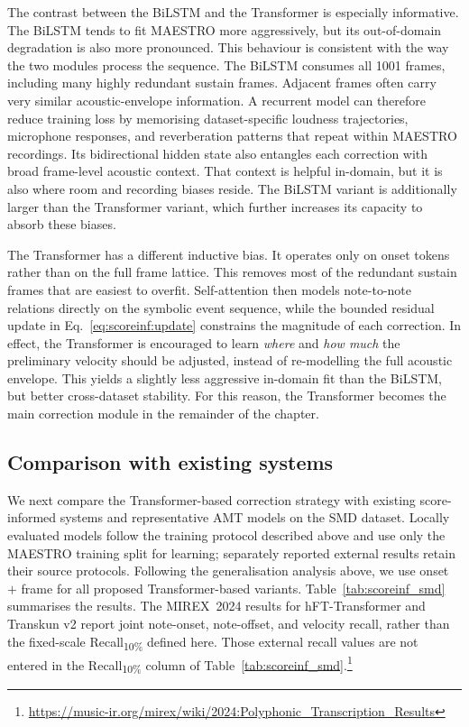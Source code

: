 The contrast between the BiLSTM and the Transformer is especially informative. The BiLSTM tends to fit MAESTRO more aggressively, but its out-of-domain degradation is also more pronounced. This behaviour is consistent with the way the two modules process the sequence. The BiLSTM consumes all 1001 frames, including many highly redundant sustain frames. Adjacent frames often carry very similar acoustic-envelope information. A recurrent model can therefore reduce training loss by memorising dataset-specific loudness trajectories, microphone responses, and reverberation patterns that repeat within MAESTRO recordings. Its bidirectional hidden state also entangles each correction with broad frame-level acoustic context. That context is helpful in-domain, but it is also where room and recording biases reside. The BiLSTM variant is additionally larger than the Transformer variant, which further increases its capacity to absorb these biases.

The Transformer has a different inductive bias. It operates only on onset tokens rather than on the full frame lattice. This removes most of the redundant sustain frames that are easiest to overfit. Self-attention then models note-to-note relations directly on the symbolic event sequence, while the bounded residual update in Eq.~\eqref{eq:scoreinf:update} constrains the magnitude of each correction. In effect, the Transformer is encouraged to learn \emph{where} and \emph{how much} the preliminary velocity should be adjusted, instead of re-modelling the full acoustic envelope. This yields a slightly less aggressive in-domain fit than the BiLSTM, but better cross-dataset stability. For this reason, the Transformer becomes the main correction module in the remainder of the chapter.

\subsection{Comparison with existing systems}
\label{sec:scoreinf:results:comparison}

We next compare the Transformer-based correction strategy with existing score-informed systems and representative AMT models on the SMD dataset. Locally evaluated models follow the training protocol described above and use only the MAESTRO training split for learning; separately reported external results retain their source protocols. Following the generalisation analysis above, we use onset $+$ frame for all proposed Transformer-based variants. Table~\ref{tab:scoreinf_smd} summarises the results. The MIREX~2024 results for hFT-Transformer and Transkun v2 report joint note-onset, note-offset, and velocity recall, rather than the fixed-scale Recall\textsubscript{10\%} defined here. Those external recall values are not entered in the Recall\textsubscript{10\%} column of Table~\ref{tab:scoreinf_smd}.\footnote{\url{https://music-ir.org/mirex/wiki/2024:Polyphonic_Transcription_Results}}

